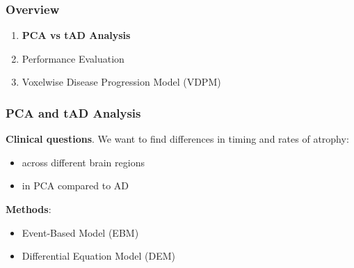 \documentclass[10pt,xcolor=table]{beamer}
\begin{document}
\begin{frame}
\frametitle{Overview}

\begin{enumerate}
 \item \textbf{PCA vs tAD Analysis}
 \item Performance Evaluation
 \item Voxelwise Disease Progression Model (VDPM)
\end{enumerate}

\end{frame}

\begin{frame}
\frametitle{PCA and tAD Analysis}

\textbf{Clinical questions}. We want to find differences in timing and rates of atrophy:
\begin{itemize}
\item across different brain regions 
\item in PCA compared to AD 
\end{itemize}

\textbf{Methods}:
\begin{itemize}
 \item Event-Based Model (EBM)
 \item Differential Equation Model (DEM)
\end{itemize}


\end{frame}

\newcommand*{\scaleBrainImg}{0.2}
\newcommand*{\scaleAllSubfigsImg}{1}

\newcommand*{\snapLocationPCA}{../images/ebm/mriAllGaussUnifDirPCA/snapshots} %
\end{document}
